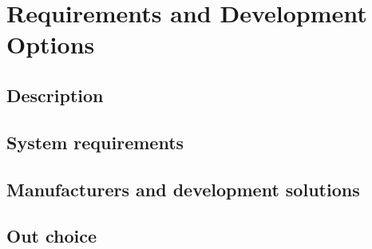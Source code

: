 \chapter{Requirements and Development Options}

\section{Description}

\section{System requirements}

\section{Manufacturers and development solutions}

\section{Out choice}
